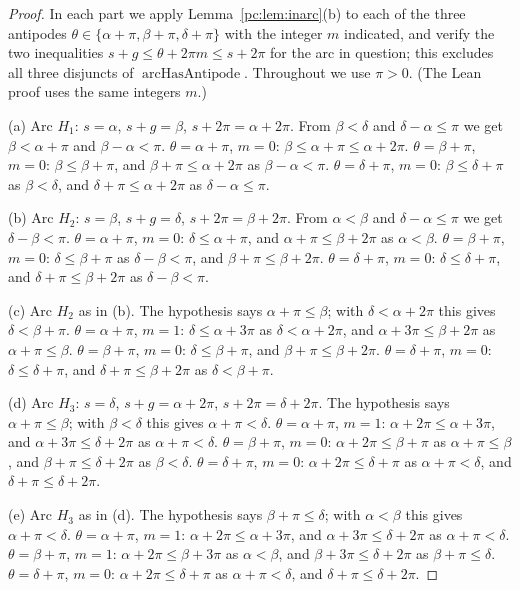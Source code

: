 \begin{proof}
In each part we apply Lemma~\ref{pc:lem:inarc}(b) to each of the three antipodes $\theta\in\{\alpha+\pi,
\beta+\pi,\delta+\pi\}$ with the integer $m$ indicated, and verify the two inequalities
$s+g\le\theta+2\pi m\le s+2\pi$ for the arc in question; this excludes all three disjuncts of
$\operatorname{arcHasAntipode}$. Throughout we use $\pi>0$. (The Lean proof uses the same integers $m$.)

(a) Arc $H_1$: $s=\alpha$, $s+g=\beta$, $s+2\pi=\alpha+2\pi$. From $\beta<\delta$ and $\delta-\alpha\le\pi$ we get
$\beta<\alpha+\pi$ and $\beta-\alpha<\pi$.
$\theta=\alpha+\pi$, $m=0$: $\beta\le\alpha+\pi\le\alpha+2\pi$.
$\theta=\beta+\pi$, $m=0$: $\beta\le\beta+\pi$, and $\beta+\pi\le\alpha+2\pi$ as $\beta-\alpha<\pi$.
$\theta=\delta+\pi$, $m=0$: $\beta\le\delta+\pi$ as $\beta<\delta$, and $\delta+\pi\le\alpha+2\pi$ as $\delta-\alpha\le\pi$.

(b) Arc $H_2$: $s=\beta$, $s+g=\delta$, $s+2\pi=\beta+2\pi$. From $\alpha<\beta$ and $\delta-\alpha\le\pi$ we get
$\delta-\beta<\pi$.
$\theta=\alpha+\pi$, $m=0$: $\delta\le\alpha+\pi$, and $\alpha+\pi\le\beta+2\pi$ as $\alpha<\beta$.
$\theta=\beta+\pi$, $m=0$: $\delta\le\beta+\pi$ as $\delta-\beta<\pi$, and $\beta+\pi\le\beta+2\pi$.
$\theta=\delta+\pi$, $m=0$: $\delta\le\delta+\pi$, and $\delta+\pi\le\beta+2\pi$ as $\delta-\beta<\pi$.

(c) Arc $H_2$ as in (b). The hypothesis says $\alpha+\pi\le\beta$; with $\delta<\alpha+2\pi$ this gives
$\delta<\beta+\pi$.
$\theta=\alpha+\pi$, $m=1$: $\delta\le\alpha+3\pi$ as $\delta<\alpha+2\pi$, and $\alpha+3\pi\le\beta+2\pi$ as
$\alpha+\pi\le\beta$.
$\theta=\beta+\pi$, $m=0$: $\delta\le\beta+\pi$, and $\beta+\pi\le\beta+2\pi$.
$\theta=\delta+\pi$, $m=0$: $\delta\le\delta+\pi$, and $\delta+\pi\le\beta+2\pi$ as $\delta<\beta+\pi$.

(d) Arc $H_3$: $s=\delta$, $s+g=\alpha+2\pi$, $s+2\pi=\delta+2\pi$. The hypothesis says $\alpha+\pi\le\beta$; with
$\beta<\delta$ this gives $\alpha+\pi<\delta$.
$\theta=\alpha+\pi$, $m=1$: $\alpha+2\pi\le\alpha+3\pi$, and $\alpha+3\pi\le\delta+2\pi$ as $\alpha+\pi<\delta$.
$\theta=\beta+\pi$, $m=0$: $\alpha+2\pi\le\beta+\pi$ as $\alpha+\pi\le\beta$, and $\beta+\pi\le\delta+2\pi$ as
$\beta<\delta$.
$\theta=\delta+\pi$, $m=0$: $\alpha+2\pi\le\delta+\pi$ as $\alpha+\pi<\delta$, and $\delta+\pi\le\delta+2\pi$.

(e) Arc $H_3$ as in (d). The hypothesis says $\beta+\pi\le\delta$; with $\alpha<\beta$ this gives
$\alpha+\pi<\delta$.
$\theta=\alpha+\pi$, $m=1$: $\alpha+2\pi\le\alpha+3\pi$, and $\alpha+3\pi\le\delta+2\pi$ as $\alpha+\pi<\delta$.
$\theta=\beta+\pi$, $m=1$: $\alpha+2\pi\le\beta+3\pi$ as $\alpha<\beta$, and $\beta+3\pi\le\delta+2\pi$ as
$\beta+\pi\le\delta$.
$\theta=\delta+\pi$, $m=0$: $\alpha+2\pi\le\delta+\pi$ as $\alpha+\pi<\delta$, and $\delta+\pi\le\delta+2\pi$.


\end{proof}
